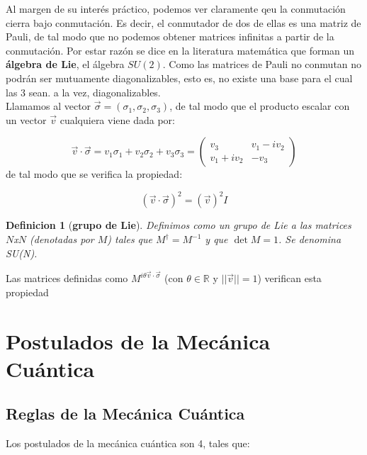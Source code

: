 \documentclass[12pt,a4paper]{book}
\numberwithin{equation}{chapter}
\numberwithin{figure}{chapter}
\newtheorem{definition}{Definicion}[section]
\begin{document}
Al margen de su interés práctico, podemos ver claramente qeu la conmutación cierra bajo conmutación. Es decir, el conmutador de dos de ellas es una matriz de Pauli, de tal modo que no podemos obtener matrices infinitas a partir de la conmutación. Por estar razón se dice en la literatura matemática que forman un \textbf{álgebra de Lie}, el álgebra $SU(2)$. Como las matrices de Pauli no conmutan no podrán ser mutuamente diagonalizables, esto es, no existe una base para el cual las 3 sean. a la vez, diagonalizables. \\

Llamamos al vector $\vec{\sigma} = (\sigma_1,\sigma_2,\sigma_3)$, de tal modo que el producto escalar con un vector $\vec{v}$ cualquiera viene dada por:

\begin{equation}
\vec{v} \cdot \vec{\sigma} = v_1 \sigma_1 + v_2 \sigma_2 + v_3 \sigma_3 = \begin{pmatrix}
v_3 & v_1 - i v_2 \\
v_1 + i v_2 & - v_3
\end{pmatrix}
\end{equation}
de tal modo que se verifica la propiedad:

\begin{equation}
(\vec{v} \cdot \vec{\sigma})^2 = (\vec{v})^2  I
\end{equation}

\begin{definition}[\textbf{grupo de Lie}]
Definimos como un grupo de Lie a las matrices $N$x$N$ (denotadas por $M$) tales que $M^\dagger = M^{-1}$ y que $\det M = 1$. Se denomina SU(N). 
\end{definition}

Las matrices definidas como $M^{i \theta \vec{v} \cdot \vec{\sigma}}$ (con $\theta \in \mathbb{R}$ y $||\vec{v}||=1$) verifican esta propiedad

\newpage

\chapter{Postulados de la Mecánica Cuántica}

\section{Reglas de la Mecánica Cuántica} \label{Subsec:02.01}

Los postulados de la mecánica cuántica son 4, tales que:
\end{document}
